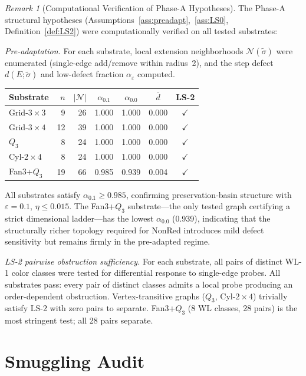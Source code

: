 \documentclass[11pt,a4paper]{article}
\theoremstyle{definition}
\theoremstyle{remark}
\newtheorem{remark}[theorem]{Remark}
\begin{document}
\begin{remark}[Computational Verification of Phase-A Hypotheses]\label{rem:preadapt-verify}
The Phase-A structural hypotheses (Assumptions~\ref{ass:preadapt},~\ref{ass:LS0}, Definition~\ref{def:LS2}) were computationally verified on all tested substrates:

\emph{Pre-adaptation.} For each substrate, local extension neighborhoods $\mathcal{N}(\tilde{\sigma})$ were enumerated (single-edge add/remove within radius~2), and the step defect $d(E;\tilde{\sigma})$ and low-defect fraction $\alpha_\varepsilon$ computed.
\begin{center}\small
\begin{tabular}{lrrcccc}
\toprule
Substrate & $n$ & $|\mathcal{N}|$ & $\alpha_{0.1}$ & $\alpha_{0.0}$ & $\bar{d}$ & LS-2 \\
\midrule
Grid-$3{\times}3$ & 9 & 26 & 1.000 & 1.000 & 0.000 & $\checkmark$ \\
Grid-$3{\times}4$ & 12 & 39 & 1.000 & 1.000 & 0.000 & $\checkmark$ \\
$Q_3$ & 8 & 24 & 1.000 & 1.000 & 0.000 & $\checkmark$ \\
Cyl-$2{\times}4$ & 8 & 24 & 1.000 & 1.000 & 0.000 & $\checkmark$ \\
Fan3+$Q_3$ & 19 & 66 & 0.985 & 0.939 & 0.004 & $\checkmark$ \\
\bottomrule
\end{tabular}
\end{center}
All substrates satisfy $\alpha_{0.1} \geq 0.985$, confirming preservation-basin structure with $\varepsilon = 0.1$, $\eta \leq 0.015$. The Fan3+$Q_3$ substrate---the only tested graph certifying a strict dimensional ladder---has the lowest $\alpha_{0.0}$ (0.939), indicating that the structurally richer topology required for NonRed introduces mild defect sensitivity but remains firmly in the pre-adapted regime.

\emph{LS-2 pairwise obstruction sufficiency.} For each substrate, all pairs of distinct WL-1 color classes were tested for differential response to single-edge probes. All substrates pass: every pair of distinct classes admits a local probe producing an order-dependent obstruction. Vertex-transitive graphs ($Q_3$, Cyl-$2{\times}4$) trivially satisfy LS-2 with zero pairs to separate. Fan3+$Q_3$ (8 WL classes, 28 pairs) is the most stringent test; all 28 pairs separate.
\end{remark}


\section{Smuggling Audit}\label{app:smuggle}
\end{document}
